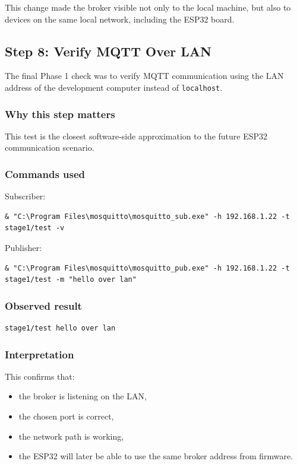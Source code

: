 \documentclass[12pt,a4paper]{article}
\begin{document}
This change made the broker visible not only to the local machine, but also to
devices on the same local network, including the ESP32 board.

\subsection{Step 8: Verify MQTT Over LAN}

The final Phase 1 check was to verify MQTT communication using the LAN address
of the development computer instead of \texttt{localhost}.

\subsubsection*{Why this step matters}

This test is the closest software-side approximation to the future ESP32
communication scenario.

\subsubsection*{Commands used}

Subscriber:

\begin{lstlisting}
& "C:\Program Files\mosquitto\mosquitto_sub.exe" -h 192.168.1.22 -t stage1/test -v
\end{lstlisting}

Publisher:

\begin{lstlisting}
& "C:\Program Files\mosquitto\mosquitto_pub.exe" -h 192.168.1.22 -t stage1/test -m "hello over lan"
\end{lstlisting}

\subsubsection*{Observed result}

\begin{lstlisting}
stage1/test hello over lan
\end{lstlisting}

\subsubsection*{Interpretation}

This confirms that:

\begin{itemize}
    \item the broker is listening on the LAN,
    \item the chosen port is correct,
    \item the network path is working,
    \item the ESP32 will later be able to use the same broker address from
    firmware.
\end{itemize}
\end{document}

